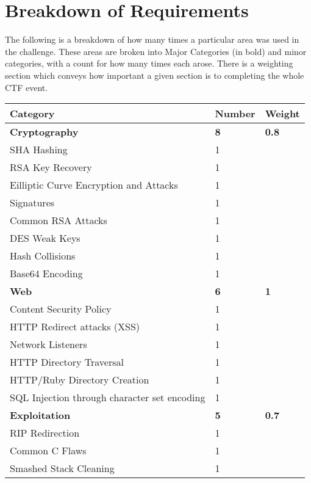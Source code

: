 \documentclass[a4paper,11pt]{report}
\begin{document}
	\section{Breakdown of Requirements}
	 	The following is a breakdown of how many times a particular area was used in the challenge. 
		These areas are broken into Major Categories (in bold) and minor categories, with a count for how many times each arose. 
		There is a weighting section which conveys how important a given section is to completing the whole CTF event. 
		\begin{table}[H]
			\centering
			\begin{tabular}{| l | l | l |}
				\hline
				\textbf{Category} & \textbf{Number} & \textbf{Weight} \\ \hline 
				\textbf{Cryptography} & \textbf{8} & \textbf{0.8}\\ \hline
				\quad SHA Hashing & 1 & \\ \hline 
				\quad RSA Key Recovery & 1 & \\ \hline
				\quad Eilliptic Curve Encryption and Attacks & 1 & \\ \hline
				\quad Signatures & 1 & \\ \hline 
				\quad Common RSA Attacks & 1 & \\ \hline
				\quad DES Weak Keys & 1 & \\ \hline 
				\quad Hash Collisions & 1 & \\ \hline 
				\quad Base64 Encoding & 1 & \\ \hline 
				\textbf{Web} & \textbf{6} & \textbf{1} \\ \hline 
				\quad Content Security Policy & 1 & \\ \hline 
				\quad HTTP Redirect attacks (XSS) & 1 & \\ \hline 
				\quad Network Listeners & 1 & \\ \hline 
				\quad HTTP Directory Traversal & 1 & \\ \hline 
				\quad HTTP/Ruby Directory Creation & 1 & \\ \hline 
				\quad SQL Injection through character set encoding & 1 & \\ \hline 
				\textbf{Exploitation} & \textbf{5} & \textbf{0.7} \\ \hline 
				\quad RIP Redirection & 1 & \\ \hline 
				\quad Common C Flaws & 1 & \\ \hline 
				\quad Smashed Stack Cleaning & 1 & \\ \hline 

\end{tabular}
\end{table}
\end{document}
